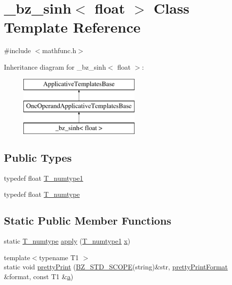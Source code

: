 \hypertarget{class__bz__sinh_3_01float_01_4}{}\section{\+\_\+bz\+\_\+sinh$<$ float $>$ Class Template Reference}
\label{class__bz__sinh_3_01float_01_4}


{\ttfamily \#include $<$mathfunc.\+h$>$}

Inheritance diagram for \+\_\+bz\+\_\+sinh$<$ float $>$\+:\begin{figure}[H]
\begin{center}
\leavevmode
\includegraphics[height=3.000000cm]{class__bz__sinh_3_01float_01_4}
\end{center}
\end{figure}
\subsection*{Public Types}
\begin{DoxyCompactItemize}
\item 
typedef float \hyperlink{class__bz__sinh_3_01float_01_4_aafd4b2113b0d5581eb44a6d0e1ad0242}{T\+\_\+numtype1}
\item 
typedef float \hyperlink{class__bz__sinh_3_01float_01_4_abfe11da3e607f922f677c77816b22dbd}{T\+\_\+numtype}
\end{DoxyCompactItemize}
\subsection*{Static Public Member Functions}
\begin{DoxyCompactItemize}
\item 
static \hyperlink{class__bz__sinh_3_01float_01_4_abfe11da3e607f922f677c77816b22dbd}{T\+\_\+numtype} \hyperlink{class__bz__sinh_3_01float_01_4_ac89e457a114dfddf7c56c93ba704ac4e}{apply} (\hyperlink{class__bz__sinh_3_01float_01_4_aafd4b2113b0d5581eb44a6d0e1ad0242}{T\+\_\+numtype1} \hyperlink{vecnorm1_8cc_ac73eed9e41ec09d58f112f06c2d6cb63}{x})
\item 
{\footnotesize template$<$typename T1 $>$ }\\static void \hyperlink{class__bz__sinh_3_01float_01_4_a5e64453fb85ef5edde80e6181be082d1}{pretty\+Print} (\hyperlink{numinquire_8h_a2b24ffc3b4ef9803956bc7715c6c7b83}{B\+Z\+\_\+\+S\+T\+D\+\_\+\+S\+C\+O\+P\+E}(string)\&str, \hyperlink{classprettyPrintFormat}{pretty\+Print\+Format} \&format, const T1 \&\hyperlink{gen__mat5files_8m_aae328bf20413f220e38aec4d95bfd6da}{a})
\end{DoxyCompactItemize}


